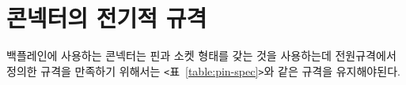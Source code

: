\section{콘넥터의 전기적 규격}
백플레인에 사용하는 콘넥터는 핀과 소켓 형태를 갖는 것을 사용하는데
전원규격에서 정의한 규격을 만족하기 위해서는 {\tt <}표~\ref{table:pin-spec}{\tt >}와
같은 규격을 유지해야된다.

